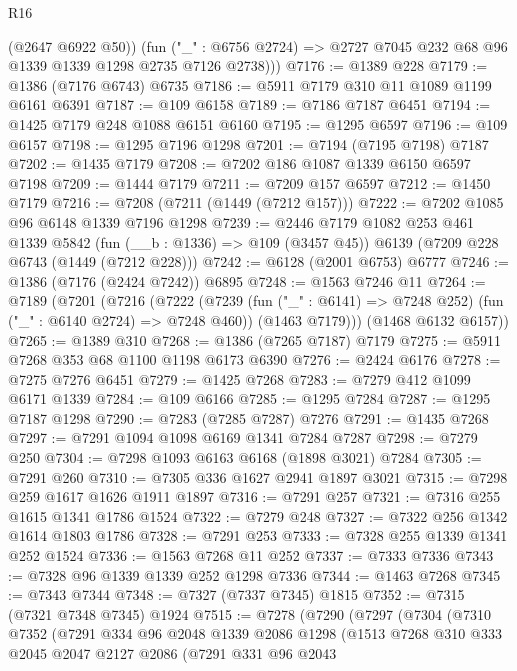\begin{lexlean}{R16}
\begin{coremodule}
          (@2647 @6922 @50))
        (fun ("_" : @6756 @2724) => @2727 @7045 @232 @68 @96 @1339 @1339 @1298 @2735 @7126 @2738)))
@7176 := @1389 @228
@7179 := @1386 (@7176 @6743) @6735
@7186 := @5911 @7179 @310 @11 @1089 @1199 @6161 @6391
@7187 := @109 @6158
@7189 := @7186 @7187 @6451
@7194 := @1425 @7179 @248 @1088 @6151 @6160
@7195 := @1295 @6597
@7196 := @109 @6157
@7198 := @1295 @7196 @1298
@7201 := @7194 (@7195 @7198) @7187
@7202 := @1435 @7179
@7208 := @7202 @186 @1087 @1339 @6150 @6597 @7198
@7209 := @1444 @7179
@7211 := @7209 @157 @6597
@7212 := @1450 @7179
@7216 := @7208 (@7211 (@1449 (@7212 @157)))
@7222 := @7202 @1085 @96 @6148 @1339 @7196 @1298
@7239 := @2446
    @7179
    @1082
    @253
    @461
    @1339
    @5842
    (fun (__b : @1336) => @109 (@3457 @45))
    @6139
    (@7209 @228 @6743 (@1449 (@7212 @228)))
@7242 := @6128 (@2001 @6753) @6777
@7246 := @1386 (@7176 (@2424 @7242)) @6895
@7248 := @1563 @7246 @11
@7264 := @7189
    (@7201
      (@7216
        (@7222
          (@7239 (fun ("_" : @6141) => @7248 @252) (fun ("_" : @6140 @2724) => @7248 @460))
          (@1463 @7179)))
      (@1468 @6132 @6157))
@7265 := @1389 @310
@7268 := @1386 (@7265 @7187) @7179
@7275 := @5911 @7268 @353 @68 @1100 @1198 @6173 @6390
@7276 := @2424 @6176
@7278 := @7275 @7276 @6451
@7279 := @1425 @7268
@7283 := @7279 @412 @1099 @6171 @1339
@7284 := @109 @6166
@7285 := @1295 @7284
@7287 := @1295 @7187 @1298
@7290 := @7283 (@7285 @7287) @7276
@7291 := @1435 @7268
@7297 := @7291 @1094 @1098 @6169 @1341 @7284 @7287
@7298 := @7279 @250
@7304 := @7298 @1093 @6163 @6168 (@1898 @3021) @7284
@7305 := @7291 @260
@7310 := @7305 @336 @1627 @2941 @1897 @3021
@7315 := @7298 @259 @1617 @1626 @1911 @1897
@7316 := @7291 @257
@7321 := @7316 @255 @1615 @1341 @1786 @1524
@7322 := @7279 @248
@7327 := @7322 @256 @1342 @1614 @1803 @1786
@7328 := @7291 @253
@7333 := @7328 @255 @1339 @1341 @252 @1524
@7336 := @1563 @7268 @11 @252
@7337 := @7333 @7336
@7343 := @7328 @96 @1339 @1339 @252 @1298 @7336
@7344 := @1463 @7268
@7345 := @7343 @7344
@7348 := @7327 (@7337 @7345) @1815
@7352 := @7315 (@7321 @7348 @7345) @1924
@7515 := @7278
    (@7290
      (@7297
        (@7304
          (@7310
            @7352
            (@7291
              @334
              @96
              @2048
              @1339
              @2086
              @1298
              (@1513
                @7268
                @310
                @333
                @2045
                @2047
                @2127
                @2086
                (@7291
                  @331
                  @96
                  @2043

\end{coremodule}
\end{lexlean}
